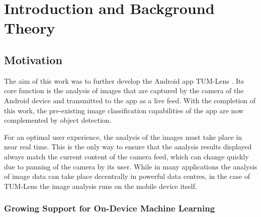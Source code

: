 \documentclass[
			   fontsize=11pt,
               paper=a4,
               bibliography=totoc,
               idxtotoc,
               headsepline,
               footsepline,
               footinclude=false,
               BCOR=12mm,
               DIV=13,
               openany,   %
               ]
               {scrbook}
\begin{document}
\tableofcontents
\thispagestyle{empty}
\cleardoubleemptypage


\mainmatter

\part{Introduction and Background Theory}

\chapter{Motivation} \label{chap:motivation}

The aim of this work was to further develop the Android app TUM-Lens \cite{lensApp}. Its core function is the analysis of images that are captured by the camera of the Android device and transmitted to the app as a live feed. With the completion of this work, the pre-existing image classification capabilities of the app are now complemented by object detection.

For an optimal user experience, the analysis of the images must take place in near real time. This is the only way to ensure that the analysis results displayed always match the current content of the camera feed, which can change  quickly due to panning of the camera by its user. While in many applications the analysis of image data can take place decentrally in powerful data centres, in the case of TUM-Lens the image analysis runs on the mobile device itself.


\section{Growing Support for On-Device Machine Learning}
\end{document}
